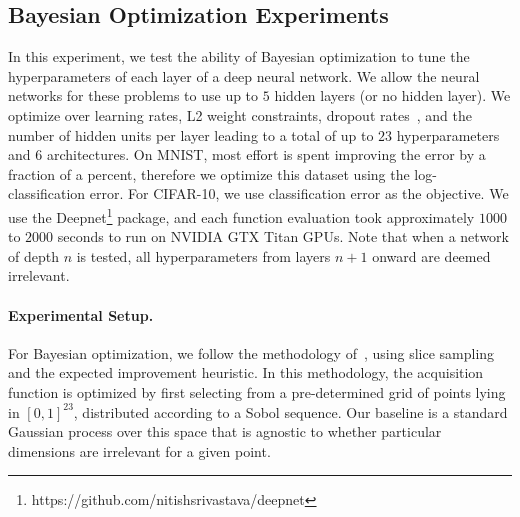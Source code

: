 \documentclass{article}
\begin{document}
\subsection{Bayesian Optimization Experiments}  
\vspace{-0.05in} 
In this experiment, we test the ability of Bayesian optimization to tune the hyperparameters of each layer of a deep neural network. We allow the neural networks for these problems to use up to $5$ hidden layers (or no hidden layer). We optimize over learning rates, L2 weight constraints, dropout rates~\cite{hinton2012improving}, and the number of hidden units per layer leading to a total of up to $23$ hyperparameters and $6$ architectures. On MNIST, most effort is spent improving the error by a fraction of a percent, therefore we optimize this dataset using the log-classification error. For CIFAR-10, we use classification error as the objective. We use the Deepnet\footnote{https://github.com/nitishsrivastava/deepnet} package, and each function evaluation took approximately $1000$ to $2000$ seconds to run on NVIDIA GTX Titan GPUs. Note that when a network of depth $n$ is tested, all hyperparameters from layers $n+1$ onward are deemed irrelevant.
\paragraph{Experimental Setup.}
For Bayesian optimization, we follow the methodology of~\cite{snoek-etal-2012b}, using slice sampling and the expected improvement heuristic. In this methodology, the acquisition function is optimized by first selecting from a pre-determined grid of points lying in $[0,1]^{23}$, distributed according to a Sobol sequence. Our baseline is a standard Gaussian process over this space that is agnostic to whether particular dimensions are irrelevant for a given point.
\end{document}

